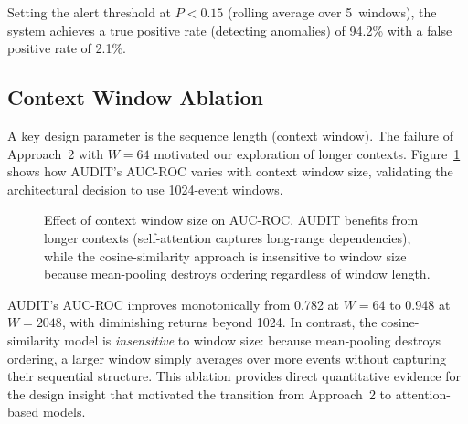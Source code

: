 \documentclass[letterpaper,twocolumn,10pt]{article}
\begin{document}
Setting the alert threshold at $P < 0.15$ (rolling average over
5~windows), the system achieves a true positive rate (detecting
anomalies) of 94.2\% with a false positive rate of 2.1\%.


\subsection{Context Window Ablation}

A key design parameter is the sequence length (context window).
The failure of Approach~2 with $W{=}64$ motivated our exploration
of longer contexts.  Figure~\ref{fig:context_ablation} shows how
AUDIT's AUC-ROC varies with context window size, validating the
architectural decision to use 1024-event windows.

\begin{figure}[t]
\centering
{}
\caption{Effect of context window size on AUC-ROC.  AUDIT benefits
from longer contexts (self-attention captures long-range
dependencies), while the cosine-similarity approach is insensitive
to window size because mean-pooling destroys ordering regardless of
window length.}
\label{fig:context_ablation}
\end{figure}

AUDIT's AUC-ROC improves monotonically from 0.782 at $W{=}64$ to
0.948 at $W{=}2048$, with diminishing returns beyond 1024.  In
contrast, the cosine-similarity model is \emph{insensitive} to
window size: because mean-pooling destroys ordering, a larger
window simply averages over more events without capturing their
sequential structure.  This ablation provides direct quantitative
evidence for the design insight that motivated the transition from
Approach~2 to attention-based models.
\end{document}
